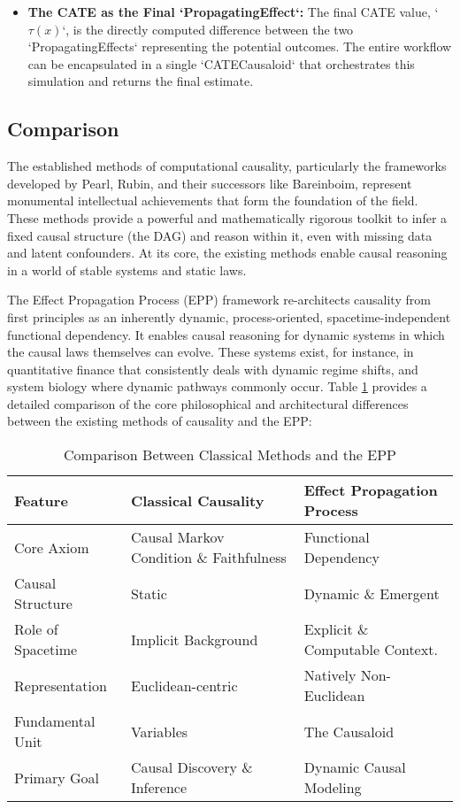 \begin{itemize}
\item \textbf{The CATE as the Final `PropagatingEffect`:}
The final CATE value, `$\tau(x)$`, is the directly computed difference between the two `PropagatingEffects` representing the potential outcomes. The entire workflow can be encapsulated in a single `CATECausaloid` that orchestrates this simulation and returns the final estimate.
\end{itemize}


\subsection{Comparison}
\label{sec:epp_comparison}

The established methods of computational causality, particularly the frameworks developed by Pearl, Rubin, and their successors like Bareinboim, represent monumental intellectual achievements that form the foundation of the field. These methods provide a powerful and mathematically rigorous toolkit to infer a fixed causal structure (the DAG) and reason within it, even with missing data and latent confounders. At its core, the existing methods enable causal reasoning in a world of stable systems and static laws.

The Effect Propagation Process (EPP) framework re-architects causality from first principles as an inherently dynamic, process-oriented, spacetime-independent functional dependency. It enables causal reasoning for dynamic systems in which the causal laws themselves can evolve. These systems exist, for instance, in quantitative finance that consistently deals with dynamic regime shifts, and system biology where dynamic pathways commonly occur. Table \ref{tab:epp_comparison} provides a detailed comparison of the core philosophical and architectural differences between the existing methods of causality and the EPP:


\begin{table}[h!]
\caption{Comparison Between Classical Methods and the EPP}
\label{tab:epp_comparison}
\begin{tabular}{|l|l|l|}
\hline
Feature           & Classical Causality                        & Effect Propagation Process      
\\ \hline
Core Axiom        & Causal Markov Condition \& Faithfulness       & Functional Dependency          \\ \hline
Causal Structure  & Static                                       & Dynamic \& Emergent            \\ \hline
Role of Spacetime & Implicit Background                          & Explicit \& Computable Context. \\ \hline
Representation    & Euclidean-centric                            & Natively Non-Euclidean         \\ \hline
Fundamental Unit  & Variables 									 & The Causaloid                  \\ \hline
Primary Goal      & Causal Discovery \& Inference                 & Dynamic Causal Modeling         \\ \hline
\end{tabular}
\end{table}


